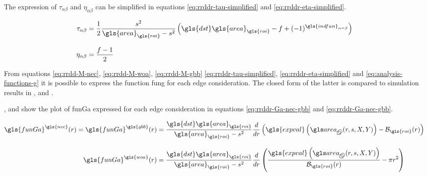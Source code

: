 The expression of \( \tau_{\alpha \beta} \) and \( \eta_{\alpha \beta} \) can be simplified in equations \eqref{eq:rrddr-tau-simplified} and \eqref{eq:rrddr-eta-simplified}.

\begin{align}
  \tau_{\alpha \beta} &=
    \frac{1}{2} \frac{s^2}{\gls{area}_{\gls{roi}}-s^2} \left( \gls{dst} \gls{area}_{\gls{roi}} - f + (-1)^{\gls{indfun}_{\alpha = \beta}} \right)
    \label{eq:rrddr-tau-simplified}
  \\[3mm]
  \eta_{\alpha \beta} &=
    \frac{f-1}{2}
    \label{eq:rrddr-eta-simplified}
\end{align}

\medskip

From equations \eqref{eq:rrdd-M-nec}, \eqref{eq:rrdd-M-woa}, \eqref{eq:rrdd-M-gbb} \eqref{eq:rrddr-tau-simplified}, \eqref{eq:rrddr-eta-simplified} and \eqref{eq:analysis-functions-g} it is possible to express the function \gls{fung} for each edge consideration.
The closed form of the latter is compared to simulation results in ,  and .

%
%
%

\bigskip

,  and  show the plot of \gls{funGa} expressed for each edge consideration in equations \eqref{eq:rrddr-Ga-nec-gbb} and \eqref{eq:rrddr-Ga-nec-gbb}.

\begin{align}
  \gls{funGa}^{\gls{nec}} (r) =
  \gls{funGa}^{\gls{gbb}} (r) &=
    \frac{\gls{dst} \gls{area}_{\gls{roi}}}{ \gls{area}_{\gls{roi}} - s^2} \frac{d}{dr} \left( \gls{expval} \left( \cirsqr(r, s, X, Y) \right) - \mathcal{B}_{\gls{roi}} (r) \right)
    \label{eq:rrddr-Ga-nec-gbb}
  \\[3mm]
  \gls{funGa}^{\gls{woa}} (r) &=
    \frac{\gls{dst} \gls{area}_{\gls{roi}}}{ \gls{area}_{\gls{roi}} - s^2} \frac{d}{dr} \left( \frac{\gls{expval} \left( \cirsqr(r, s, X, Y) \right)}{\mathcal{B}_{\gls{roi}}(r)} - \pi r^2 \right)
    \label{eq:rrddr-Ga-woa}
\end{align}


